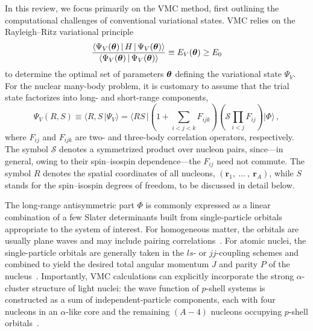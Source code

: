 In this review, we focus primarily on the VMC method, first outlining the computational challenges of conventional variational states. VMC relies on the Rayleigh–Ritz variational principle
\begin{equation}
\frac{\langle \Psi_V(\boldsymbol{\theta}) \, | \, H \, |\,  \Psi_V(\boldsymbol{\theta})\rangle}{\langle \Psi_V(\boldsymbol{\theta}) \, | \, \Psi_V(\boldsymbol{\theta})\rangle} \equiv E_V(\boldsymbol{\theta}) \geq E_0
\label{eq:variational}
\end{equation}
to determine the optimal set of parameters $\boldsymbol{\theta}$ defining the variational state $\Psi_V$. For the nuclear many-body problem, it is customary to assume that the trial state factorizes into long- and short-range components,
\begin{equation}
\Psi_V(R,S) \equiv \langle  R,S \, |\Psi_V\rangle = \langle R S \, | \left(1 + \sum_{i<j<k} F_{ijk}\right)
\left(\mathcal{S}\prod_{i<j} F_{ij}\right) | \Phi \rangle\,,
\label{eq:variational_product}
\end{equation}
where $F_{ij}$ and $F_{ijk}$ are two- and three-body correlation operators, respectively. The symbol $\mathcal{S}$ denotes a symmetrized product over nucleon pairs, since—in general, owing to their spin--isospin dependence—the $F_{ij}$ need not commute. The symbol $R$ denotes the spatial coordinates of all nucleons, $(\mathbf{r}_1, \ \dots \ , \ \mathbf{r}_A )$, while $S$ stands for the spin--isospin degrees of freedom, to be discussed in detail below. 

The long-range antisymmetric part $\Phi$ is commonly expressed as a linear combination of a few Slater determinants built from single-particle orbitals appropriate to the system of interest. For homogeneous matter, the orbitals are usually plane waves and may include pairing correlations~\cite{gandolfi2009a}. For atomic nuclei, the single-particle orbitals are generally taken in the $ls$- or $jj$-coupling schemes and combined to yield the desired total angular momentum $J$ and parity $P$ of the nucleus~\cite{pudliner_quantum_1997}. Importantly, VMC calculations can explicitly incorporate the strong $\alpha$-cluster structure of light nuclei: the wave function of $p$-shell systems is constructed as a sum of independent-particle components, each with four nucleons in an $\alpha$-like core and the remaining $(A-4)$ nucleons occupying $p$-shell orbitals~\cite{pieper_quantum_2002}.

